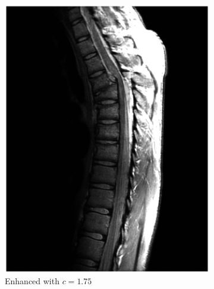 \begin{figure}[!Htb]
 \begin{subfigure}[b]{0.32\linewidth}
  \includegraphics[width=\textwidth]{breukMooi.eps}
  \caption{Enhanced with \(c=1.75\)}
  \label{fig:withEnhancement}
 \end{subfigure}
\begin{subfigure}[b]{0.32\linewidth}

\end{subfigure}
\end{figure}
